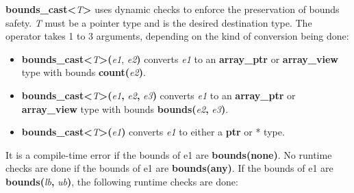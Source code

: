 \textbf{bounds\_cast\textless{}}\emph{T}\textbf{\textgreater{}} uses
dynamic checks to enforce the preservation of bounds safety. \emph{T}
must be a pointer type and is the desired destination type. The operator
takes 1 to 3 arguments, depending on the kind of conversion being done:

\begin{itemize}
\item
  \textbf{bounds\_cast\textless{}}\emph{T}\textbf{\textgreater{}(}\emph{e1},
  \emph{e2}\textbf{)} converts \emph{e1} to an \textbf{array\_ptr} or
  \textbf{array\_view} type with bounds
  \textbf{count(}\emph{e2}\textbf{)}.
\item
  \textbf{bounds\_cast\textless{}}\emph{T}\textbf{\textgreater{}(}\emph{e1}\textbf{,}
  \emph{e2}\textbf{,} \emph{e3}\textbf{)} converts \emph{e1} to an
  \textbf{array\_ptr} or \textbf{array\_view} type with bounds
  \textbf{bounds(}\emph{e2}\textbf{,} \emph{e3}\textbf{)}.
\item
  \textbf{bounds\_cast\textless{}}\emph{T}\textbf{\textgreater{}(}\emph{e1}\textbf{)}
  converts \emph{e1} to either a \textbf{ptr} or * type.
\end{itemize}

It is a compile-time error if the bounds of e1 are
\textbf{bounds(none)}. No runtime checks are done if the bounds of e1
are \textbf{bounds(any)}. If the bounds of e1 are
\textbf{bounds(}\emph{lb}\textbf{,} \emph{ub}\textbf{)}, the following
runtime checks are done:

